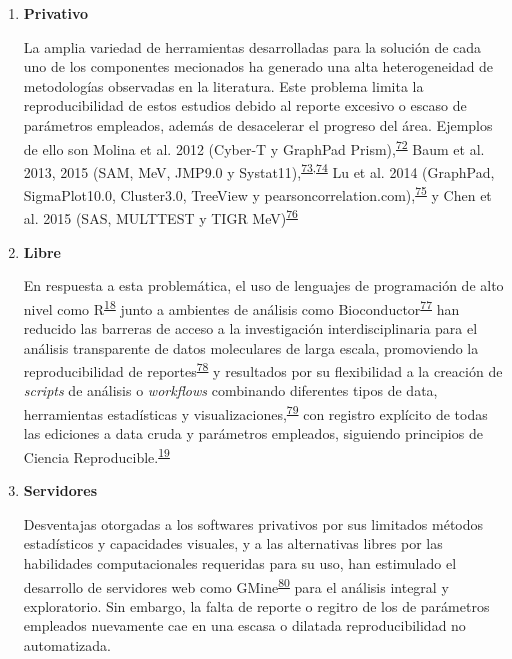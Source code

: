 \documentclass[]{article}
\begin{document}
\begin{enumerate}
\begin{enumerate}
    \begin{enumerate}
    \def\labelenumiii{\arabic{enumiii}.}
    \item
      \textbf{Privativo}

      La amplia variedad de herramientas desarrolladas para la solución
      de cada uno de los componentes mecionados ha generado una alta
      heterogeneidad de metodologías observadas en la literatura. Este
      problema limita la reproducibilidad de estos estudios debido al
      reporte excesivo o escaso de parámetros empleados, además de
      desacelerar el progreso del área. Ejemplos de ello son Molina et
      al. 2012 (Cyber-T y GraphPad
      Prism),\textsuperscript{\protect\hyperlink{ref-molina2012}{72}}
      Baum et al. 2013, 2015 (SAM, MeV, JMP9.0 y
      Systat11),\textsuperscript{\protect\hyperlink{ref-baum2013}{73},\protect\hyperlink{ref-baum2015}{74}}
      Lu et al. 2014 (GraphPad, SigmaPlot10.0, Cluster3.0, TreeView y
      pearsoncorrelation.com),\textsuperscript{\protect\hyperlink{ref-lu2014rama}{75}}
      y Chen et al. 2015 (SAS, MULTTEST y TIGR
      MeV)\textsuperscript{\protect\hyperlink{ref-chen2015immunomics}{76}}
    \item
      \textbf{Libre}

      En respuesta a esta problemática, el uso de lenguajes de
      programación de alto nivel como
      R\textsuperscript{\protect\hyperlink{ref-R}{18}} junto a ambientes
      de análisis como
      Bioconductor\textsuperscript{\protect\hyperlink{ref-bioconductor2004}{77}}
      han reducido las barreras de acceso a la investigación
      interdisciplinaria para el análisis transparente de datos
      moleculares de larga escala, promoviendo la reproducibilidad de
      reportes\textsuperscript{\protect\hyperlink{ref-knitr}{78}} y
      resultados por su flexibilidad a la creación de \emph{scripts} de
      análisis o \emph{workflows} combinando diferentes tipos de data,
      herramientas estadísticas y
      visualizaciones,\textsuperscript{\protect\hyperlink{ref-Biobase}{79}}
      con registro explícito de todas las ediciones a data cruda y
      parámetros empleados, siguiendo principios de Ciencia
      Reproducible.\textsuperscript{\protect\hyperlink{ref-CienciaReproducible2016}{19}}
      \newpage
    \item
      \textbf{Servidores}

      Desventajas otorgadas a los softwares privativos por sus limitados
      métodos estadísticos y capacidades visuales, y a las alternativas
      libres por las habilidades computacionales requeridas para su uso,
      han estimulado el desarrollo de servidores web como
      GMine\textsuperscript{\protect\hyperlink{ref-gmine2016}{80}} para
      el análisis integral y exploratorio. Sin embargo, la falta de
      reporte o regitro de los de parámetros empleados nuevamente cae en
      una escasa o dilatada reproducibilidad no automatizada.
    \end{enumerate}
  \end{enumerate}
\end{enumerate}
\end{document}
